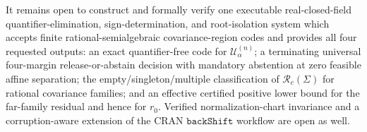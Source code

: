 It remains open to construct and formally verify one executable real-closed-field quantifier-elimination, sign-determination, and root-isolation system which accepts finite rational-semialgebraic covariance-region codes and provides all four requested outputs: an exact quantifier-free code for \(\mathcal U^{(n)}_\alpha\); a terminating universal four-margin release-or-abstain decision with mandatory abstention at zero feasible affine separation; the empty/singleton/multiple classification of \(\mathcal R_c(\Sigma)\) for rational covariance families; and an effective certified positive lower bound for the far-family residual and hence for \(r_0\). Verified normalization-chart invariance and a corruption-aware extension of the CRAN \(\texttt{backShift}\) workflow are open as well.